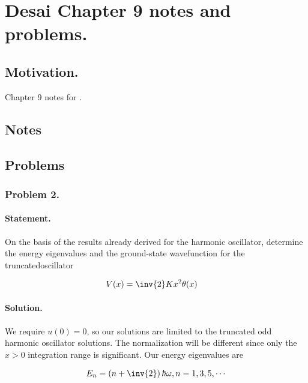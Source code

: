 
%

\chapter{Desai Chapter 9 notes and problems.}
\label{chap:desaiCh9}
{}
\date{Nov 19, 2010}

\beginArtWithToc

\section{Motivation.}

Chapter 9 notes for \cite{desai2009quantum}.

\section{Notes}
\section{Problems}

\subsection{Problem 2.}
\subsubsection{Statement.}

On the basis of the results already derived for the harmonic oscillator, determine the energy eigenvalues and the ground-state wavefunction for the truncatedoscillator

\begin{align*}
V(x) &= \inv{2} K x^2 \theta(x)
\end{align*}

\subsubsection{Solution.}

We require $u(0) = 0$, so our solutions are limited to the truncated odd harmonic oscillator solutions.  The normalization will be different since only the $x>0$ integration range is significant.  Our energy eigenvalues are

\begin{align}\label{eqn:desaiCh9:200}
E_n = \left( n + \inv{2} \right) \hbar \omega, n = 1, 3, 5, \cdots
\end{align}

